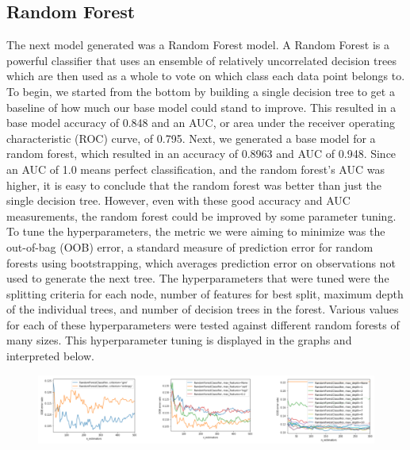 \documentclass{article}
\begin{document}
\subsection{Random Forest}
The next model generated was a Random Forest model. A Random Forest is a powerful classifier that uses an ensemble of relatively uncorrelated decision trees which are then used as a whole to vote on which class each data point belongs to. To begin, we started from the bottom by building a single decision tree to get a baseline of how much our base model could stand to improve. This resulted in a base model accuracy of 0.848 and an AUC, or area under the receiver operating characteristic (ROC) curve, of 0.795. Next, we generated a base model for a random forest, which resulted in an accuracy of 0.8963 and AUC of 0.948. Since an AUC of 1.0 means perfect classification, and the random forest’s AUC was higher, it is easy to conclude that the random forest was better than just the single decision tree. However, even with these good accuracy and AUC measurements, the random forest could be improved by some parameter tuning. To tune the hyperparameters, the metric we were aiming to minimize was the out-of-bag (OOB) error, a standard measure of prediction error for random forests using bootstrapping, which averages prediction error on observations not used to generate the next tree. The hyperparameters that were tuned were the splitting criteria for each node, number of features for best split, maximum depth of the individual trees, and number of decision trees in the forest. Various values for each of these hyperparameters were tested against different random forests of many sizes. This hyperparameter tuning is displayed in the graphs and interpreted below.
\begin{figure}[htp]
    \centering
    \includegraphics[width=12cm]{RF_hyperparameter_tuning.png}
    \label{fig:randforest}
\end{figure}
\end{document}
